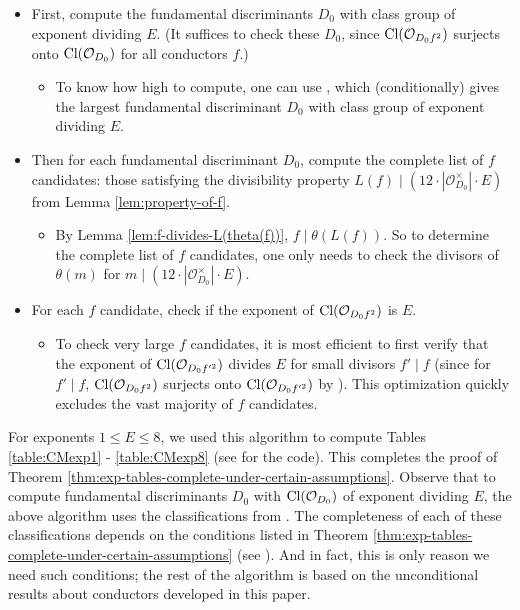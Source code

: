 \documentclass[11pt,letterpaper,reqno]{amsart}
\numberwithin{equation}{section}
\numberwithin{figure}{section}
\numberwithin{table}{section}
\newcommand{\Or}[1]{\mathcal{O}_{#1}}
\newcommand{\Cl}[1]{\textnormal{Cl}(\mathcal{O}_{#1})}
\begin{document}
\begin{itemize}
    \item First, compute the fundamental discriminants $D_0$ with class group of exponent dividing $E$. (It suffices to check these $D_0$, since $\Cl{D_0 f^2}$ surjects onto $\Cl{D_0}$ for all conductors $f$.) 
    \begin{itemize}
        \item[$\circ$] To know how high to compute, one can use  \cite[Theorem 1]{fieldexponents}, which (conditionally) gives the largest fundamental discriminant $D_0$ with class group of exponent dividing $E$.
    \end{itemize}
    \item Then for each fundamental discriminant $D_0$, compute the complete list of $f$ candidates: those satisfying the divisibility property $L(f) \mid (12 \cdot |\Or{D_0}^\times| \cdot E)$ from Lemma \ref{lem:property-of-f}.
    \begin{itemize}
        \item[$\circ$] By Lemma \ref{lem:f-divides-L(theta(f))}, $f \mid \theta(L(f))$. So to determine the complete list of $f$ candidates, one only needs to check the divisors of $\theta(m)$ for $m \mid (12 \cdot |\Or{D_0}^\times| \cdot E)$.
    \end{itemize}
    \item For each $f$ candidate, check if the exponent of $\Cl{D_0 f^2}$ is $E$.
    \begin{itemize}
        \item[$\circ$] To check very large $f$ candidates, it is most efficient to first verify that the exponent of $\Cl{D_0f'^2}$ divides $E$ for small divisors $f' \mid f$ (since for $f' \mid f$, $\Cl{D_0 f^2}$ surjects onto $\Cl{D_0 f'^2}$ by \cite[Corollary 7.17]{cox_primes_1989}). This optimization quickly excludes the vast majority of $f$ candidates.
    \end{itemize}
\end{itemize}



For exponents $1 \le E \le 8$, we used this algorithm to compute Tables \ref{table:CMexp1} - \ref{table:CMexp8} (see \cite{ross-code} for the code). This completes the proof of Theorem \ref{thm:exp-tables-complete-under-certain-assumptions}.
Observe that to compute fundamental discriminants $D_0$ with $\Cl{D_0}$ of exponent dividing $E$, the above algorithm uses the classifications from \cite[Theorem 1]{fieldexponents}. The completeness of each of these classifications depends on the conditions listed in Theorem \ref{thm:exp-tables-complete-under-certain-assumptions} (see \cite[Theorem 2]{fieldexponents}). And in fact, this is only reason we need such conditions; the rest of the algorithm is based on the unconditional results about conductors developed in this paper.
\end{document}

